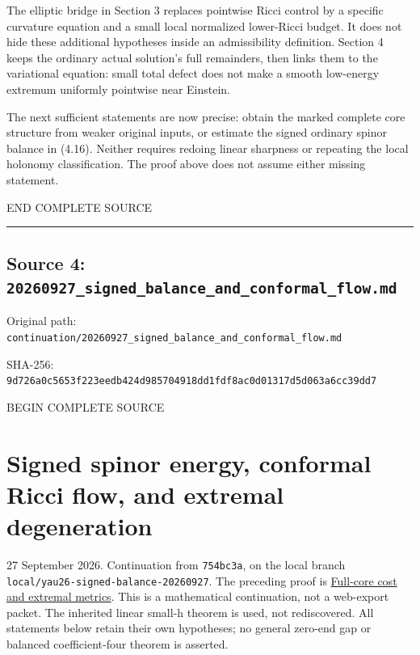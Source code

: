 \documentclass[
  10pt,
]{article}
\begin{document}
The elliptic bridge in Section 3 replaces pointwise Ricci control by a
specific curvature equation and a small local normalized lower-Ricci
budget. It does not hide these additional hypotheses inside an
admissibility definition. Section 4 keeps the ordinary actual solution's
full remainders, then links them to the variational equation: small
total defect does not make a smooth low-energy extremum uniformly
pointwise near Einstein.

The next sufficient statements are now precise: obtain the marked
complete core structure from weaker original inputs, or estimate the
signed ordinary spinor balance in (4.16). Neither requires redoing
linear sharpness or repeating the local holonomy classification. The
proof above does not assume either missing statement.

END COMPLETE SOURCE

\begin{center}\rule{0.5\linewidth}{0.5pt}\end{center}

\hypertarget{source-4-20260927_signed_balance_and_conformal_flow.md}{%
\subsection{Source 4:
\nolinkurl{20260927_signed_balance_and_conformal_flow.md}}\label{source-4-20260927_signed_balance_and_conformal_flow.md}}

Original path:
\nolinkurl{continuation/20260927_signed_balance_and_conformal_flow.md}

SHA-256:
\nolinkurl{9d726a0c5653f223eedb424d985704918dd1fdf8ac0d01317d5d063a6cc39dd7}

BEGIN COMPLETE SOURCE

\hypertarget{signed-spinor-energy-conformal-ricci-flow-and-extremal-degeneration}{%
\section{Signed spinor energy, conformal Ricci flow, and extremal
degeneration}\label{signed-spinor-energy-conformal-ricci-flow-and-extremal-degeneration}}

27 September 2026. Continuation from \texttt{754bc3a}, on the local
branch \nolinkurl{local/yau26-signed-balance-20260927}. The preceding proof
is \href{20260927_full_core_cost_and_extremal_metrics.md}{Full-core cost
and extremal metrics}. This is a mathematical continuation, not a
web-export packet. The inherited linear small-h theorem is used, not
rediscovered. All statements below retain their own hypotheses; no
general zero-end gap or balanced coefficient-four theorem is asserted.
\end{document}
